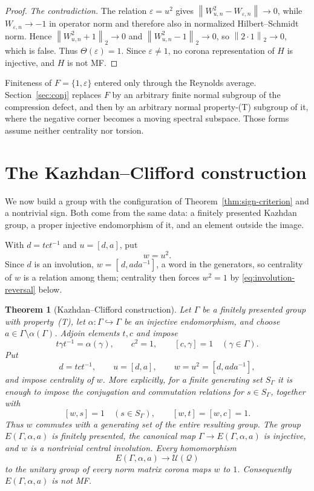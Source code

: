 \documentclass[11pt]{amsart}
\newcommand{\leanverified}[2]{\ignorespaces}
\newtheorem{theorem}{Theorem}[section]
\theoremstyle{definition}
\theoremstyle{remark}
\theoremstyle{plain}
\newcommand{\U}{\mathcal U}
\newcommand{\opnorm}[1]{\left\lVert #1\right\rVert}
\newcommand{\hsnorm}[1]{\left\lVert #1\right\rVert_{2}}
\begin{document}
\begin{proof}
\emph{The contradiction.}  The relation $\varepsilon=u^2$ gives
$\opnorm{W_{u,n}^2-W_{\varepsilon,n}}\to0$, while
$W_{\varepsilon,n}\to-1$ in operator norm and therefore also in
normalized Hilbert--Schmidt norm.  Hence $\hsnorm{W_{u,n}^2+1}\to0$
and $\hsnorm{W_{u,n}^2-1}\to0$, so $\hsnorm{2\cdot1}\to0$, which is
false.  Thus $\Theta(\varepsilon)=1$.  Since $\varepsilon\ne1$, no
corona representation of $H$ is injective, and $H$ is not MF.
\end{proof}

Finiteness of $F=\{1,\varepsilon\}$ entered only through the Reynolds
average.  Section~\ref{sec:conj} replaces $F$ by an arbitrary finite
normal subgroup of the compression defect, and then by an arbitrary
normal property-\textup{(T)} subgroup of it, where the negative corner
becomes a moving spectral subspace.  Those forms assume neither
centrality nor torsion.

\section{The Kazhdan--Clifford construction}\label{sec:construction}

We now build a group with the configuration of
Theorem~\ref{thm:sign-criterion} and a nontrivial sign.  Both come
from the same data: a finitely presented Kazhdan group, a proper
injective endomorphism of it, and an element outside the image.

With $d=tct^{-1}$ and $u=[d,a]$, put
\[
 w=u^2 .
\]
Since $d$ is an involution, $w=[\,d,ada^{-1}]$, a word in the
generators, so centrality of $w$ is a relation among them; centrality
then forces $w^2=1$ by \eqref{eq:involution-reversal} below.

\begin{theorem}[Kazhdan--Clifford construction]
\label{thm:kazhdan-clifford}
Let $\Gamma$ be a finitely presented group with property~\textup{(T)}, let
$\alpha\colon\Gamma\hookrightarrow\Gamma$ be an injective endomorphism, and
choose $a\in\Gamma\setminus\alpha(\Gamma)$.  Adjoin elements $t,c$ and impose
\[
 t\gamma t^{-1}=\alpha(\gamma),\qquad c^2=1,\qquad [c,\gamma]=1
 \quad(\gamma\in\Gamma).
\]
Put
\[
 d=tct^{-1},\qquad u=[d,a],\qquad w=u^2=[d,ada^{-1}],
\]
and impose centrality of $w$.
More explicitly, for a finite generating set $S_\Gamma$ it is enough to
impose the conjugation and commutation relations for $s\in S_\Gamma$, together with
\[
 [w,s]=1\quad(s\in S_\Gamma),\qquad [w,t]=[w,c]=1.
\]
Thus $w$ commutes with a generating set of the entire resulting group.  The
group $E(\Gamma,\alpha,a)$ is finitely presented,
the canonical map $\Gamma\to E(\Gamma,\alpha,a)$ is injective, and $w$ is a
nontrivial central involution.  Every homomorphism
\[
 E(\Gamma,\alpha,a)\longrightarrow \U(\mathcal Q)
\]
to the unitary group of every norm matrix corona maps $w$ to $1$.  Consequently
$E(\Gamma,\alpha,a)$ is not MF.
\leanverified{Sofic/KazhdanCliffordConstruction}{GroupApproximation.KazhdanCliffordConstruction.kazhdanCliffordConstruction}
\end{theorem}
\end{document}
